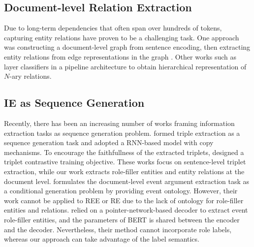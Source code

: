 \documentclass[11pt]{article}
\begin{document}
\subsection{Document-level Relation Extraction}
Due to long-term dependencies that often span over hundreds of tokens, capturing entity relations have proven to be a challenging task. One approach was constructing a document-level graph from sentence encoding, then extracting entity relations from edge representations in the graph \cite{christopoulou-etal-2019-connecting}. Other works such as \citet{jia-etal-2019-document} layer classifiers in a pipeline architecture to obtain hierarchical representation of $N$-ary relations.

\subsection{IE as Sequence Generation}
Recently, there has been an increasing number of works framing information extraction tasks as sequence generation problem. \citet{zeng-etal-2018-extracting} formed triple extraction as a sequence generation task and adopted a RNN-based model with copy mechanisms. To encourage the faithfullness of the extracted triplets, \citet{ye2020contrastive} designed a triplet contrastive training objective. These works focus on sentence-level triplet extraction, while our work extracts role-filler entities and entity relations at the document level. \citet{li2021documentlevel,hsu2021event} formulates the document-level event argument extraction task as a conditional generation problem by providing event ontology. However, their work cannot be applied to REE or RE due to the lack of ontology for role-filler entities and relations. \citet{du-2020-grit} relied on a pointer-network-based decoder \cite{10.5555/2969442.2969540} to extract event role-filler entities, and the parameters of \textsc{BERT} \cite{Devlin_2019} is shared between the encoder and the decoder. Nevertheless, their method cannot incorporate role labels, whereas our approach can take advantage of the label semantics.
\end{document}
